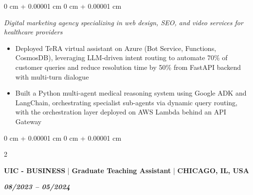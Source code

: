 \documentclass[10pt, letterpaper]{article}
\newenvironment{highlights}{
    \begin{itemize}[
        topsep=0.10 cm,
        parsep=0.10 cm,
        partopsep=0pt,
        itemsep=0pt,
        leftmargin=0 cm + 10pt
    ]
}{
    \end{itemize}
} %
\newenvironment{onecolentry}{
    \begin{adjustwidth}{
        0 cm + 0.00001 cm
    }{
        0 cm + 0.00001 cm
    }
}{
    \end{adjustwidth}
} %
\newenvironment{twocolentry}[2][]{
    \onecolentry
    \def\secondColumn{#2}
    \setcolumnwidth{\fill, 4.5 cm}
    \begin{paracol}{2}
}{
    \switchcolumn \raggedleft \secondColumn
    \end{paracol}
    \endonecolentry
} %
\begin{document}
\vspace{0.10 cm}

\begin{onecolentry}
    \textit{Digital marketing agency specializing in web design, SEO, and video services for healthcare providers}
     \begin{highlights}
                \item Deployed TeRA virtual assistant on Azure (Bot Service, Functions, CosmosDB), leveraging LLM-driven intent routing to automate 70\% of customer queries and reduce resolution time by 50\% from FastAPI backend with multi-turn dialogue

                \item Built a Python multi-agent medical reasoning system using Google ADK and LangChain, orchestrating specialist sub-agents via dynamic query routing, with the orchestration layer deployed on AWS Lambda behind an API Gateway

 \end{highlights}


   \end{onecolentry}

\vspace{0.10 cm}



\begin{twocolentry}{\textit{\textbf{08/2023 – 05/2024}}}
    \textbf{UIC - BUSINESS} | \textbf{Graduate Teaching Assistant} | \textbf{CHICAGO, IL, USA}
    
\end{twocolentry}
\end{document}
